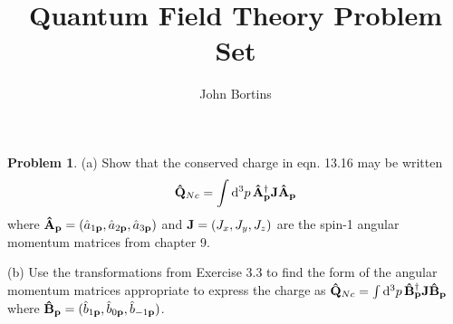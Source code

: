 \documentclass[letterpaper]{article}
\title{Quantum Field Theory Problem Set}
\author{John Bortins}
\theoremstyle{definition}
\newtheorem{prob}{Problem}[section]
\begin{document}
\maketitle{}


\begin{prob}
  (a) Show that the conserved charge in eqn. 13.16 may be written
  \[\vb{\hat{Q}}_{Nc}=\int\dd[3]{p}\vb{\hat{A}}^\dagger_{\vb{p}}\vb{J}\vb{\hat{A}}_{\vb{p}} \]
  where  $\vb{\hat{A}}_{\vb{p}}=(\hat{a}_{1\vb{p}},\hat{a}_{2\vb{p}},\hat{a}_{3\vb{p}})$ and  $\vb{J}=(J_x,J_y,J_z)$ are the spin-1 angular momentum matrices from chapter 9.

  \noindent(b) Use the transformations from Exercise 3.3 to find the form of the angular momentum matrices appropriate to express the charge as  $\vb{\hat{Q}}_{Nc}=\int\dd[3]{p}\vb{\hat{B}}^\dagger_{\vb{p}}\vb{J}\vb{\hat{B}}_{\vb{p}}$ where $\vb{\hat{B}}_{\vb{p}}=(\hat{b}_{1\vb{p}},\hat{b}_{0\vb{p}},\hat{b}_{-1\vb{p}})$.
\end{prob}
\end{document}
